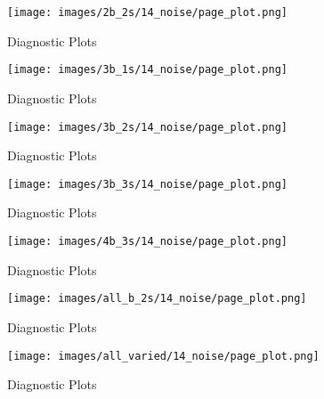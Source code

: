 \begin{figure}[h]
	\centering
	\texttt{[image: images/2b\_2s/14\_noise/page\_plot.png]}
	\caption{Diagnostic Plots}
	\label{page_2b_2s}
\end{figure}
\begin{figure}[h]
	\centering
	\texttt{[image: images/3b\_1s/14\_noise/page\_plot.png]}
	\caption{Diagnostic Plots}
	\label{page_3b_1s}
\end{figure}
\begin{figure}[h]
	\centering
	\texttt{[image: images/3b\_2s/14\_noise/page\_plot.png]}
	\caption{Diagnostic Plots}
	\label{page_3b_2s}
\end{figure}
\begin{figure}[h]
	\centering
	\texttt{[image: images/3b\_3s/14\_noise/page\_plot.png]}
	\caption{Diagnostic Plots}
	\label{page_3b_3s}
\end{figure}
\begin{figure}[h]
	\centering
	\texttt{[image: images/4b\_3s/14\_noise/page\_plot.png]}
	\caption{Diagnostic Plots}
	\label{page_4b_3s}
\end{figure}
\begin{figure}[h]
	\centering
	\texttt{[image: images/all\_b\_2s/14\_noise/page\_plot.png]}
	\caption{Diagnostic Plots}
	\label{page_all_b_2s}
\end{figure}
\begin{figure}[h]
	\centering
	\texttt{[image: images/all\_varied/14\_noise/page\_plot.png]}
	\caption{Diagnostic Plots}
	\label{page_all_varied}
\end{figure}